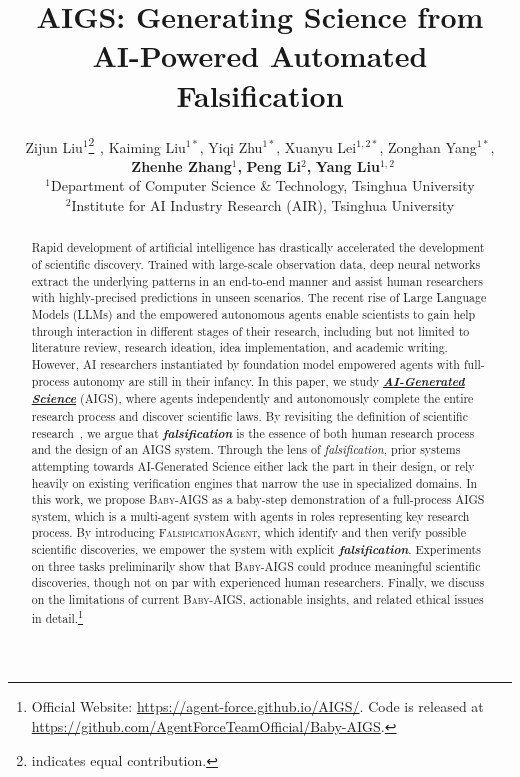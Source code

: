 \documentclass{article} %
\title{AIGS: Generating Science from AI-Powered Automated Falsification}
\author{
Zijun Liu$^{1}$\thanks{indicates equal contribution.}$^{\phantom{*}}$, Kaiming Liu$^{1*}$, Yiqi Zhu$^{1*}$, Xuanyu Lei$^{1,2*}$, Zonghan Yang$^{1*}$,\\
$\phantom{,}$\textbf{Zhenhe Zhang}$^{1}$\textbf{,} \textbf{Peng Li}$^{2}$\textbf{,} \textbf{Yang Liu}$^{1,2}$\\
$^1$Department of Computer Science \& Technology, Tsinghua University\\
$^2$Institute for AI Industry Research (AIR), Tsinghua University\\
}
\newcommand{\AIGSFull}{AI-Generated Science\xspace}
\newcommand{\AIGS}{AIGS\xspace}
\newcommand{\AIGSSys}{\textsc{Baby-AIGS}\xspace}
\newcommand{\FalsificationAgent}{\textsc{FalsificationAgent}\xspace}
\begin{document}
\maketitle

\vspace{-2pt}
\begin{abstract}

Rapid development of artificial intelligence has drastically accelerated the development of scientific discovery. Trained with large-scale observation data, deep neural networks extract the underlying patterns in an end-to-end manner and assist human researchers with highly-precised predictions in unseen scenarios. The recent rise of Large Language Models (LLMs) and the empowered autonomous agents enable scientists to gain help through interaction in different stages of their research, including but not limited to literature review, research ideation, idea implementation, and academic writing. However, AI researchers instantiated by foundation model empowered agents with full-process autonomy are still in their infancy. In this paper, we study \underline{\textbf{\textit{\AIGSFull}}} (\AIGS), where agents independently and autonomously complete the entire research process and discover scientific laws. By revisiting the definition of scientific research~\citep{Popper1935-POPTLO-7}, we argue that \textit{\textbf{falsification}} is the essence of both human research process and the design of an \AIGS system. Through the lens of \textit{falsification}, prior systems attempting towards \AIGSFull either lack the part in their design, or rely heavily on existing verification engines that narrow the use in specialized domains. In this work, we propose \AIGSSys as a baby-step demonstration of a full-process \AIGS system, which is a multi-agent system with agents in roles representing key research process. By introducing \FalsificationAgent, which identify and then verify possible scientific discoveries, we empower the system with explicit \textit{\textbf{falsification}}. Experiments on three tasks preliminarily show that \AIGSSys could produce meaningful scientific discoveries, though not on par with experienced human researchers. Finally, we discuss on the limitations of current \AIGSSys, actionable insights, and related ethical issues in detail.\footnote{Official Website: \url{https://agent-force.github.io/AIGS/}. Code is released at \url{https://github.com/AgentForceTeamOfficial/Baby-AIGS}.} 

\end{abstract}
\end{document}
